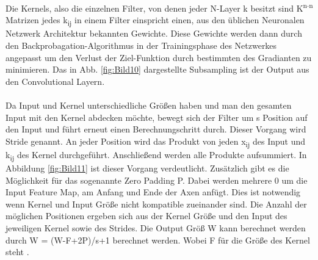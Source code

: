 \documentclass{llncs}
\begin{document}
Die Kernels, also die einzelnen Filter, von denen jeder N-Layer k besitzt sind K\textsuperscript{n$\cdot$n} Matrizen jedes k\textsubscript{ij} in einem Filter einspricht einen, aus den üblichen Neuronalen Netzwerk Architektur bekannten Gewichte. Diese Gewichte werden dann durch den Backprobagation-Algorithmus in der Trainingsphase des Netzwerkes angepasst um den Verlust der Ziel-Funktion durch bestimmten des Gradianten zu minimieren. Das in Abb. \ref{fig:Bild10} dargestellte Subsampling ist der Output aus den Convolutional Layern\cite{Grundlagen}. 
\\\\
Da Input und Kernel unterschiedliche Größen haben und man den gesamten Input mit den Kernel abdecken möchte, bewegt sich der Filter um s Position auf den Input und führt erneut einen Berechnungschritt durch. Dieser Vorgang wird Stride genannt. An jeder Position wird das Produkt von jeden x\textsubscript{ij} des Input und k\textsubscript{ij} des Kernel durchgeführt.  Anschließend werden alle Produkte aufsummiert. In Abbildung \ref{fig:Bild11} ist dieser Vorgang verdeutlicht. Zusätzlich gibt es die Möglichkeit für das sogenannte Zero Padding P. Dabei werden mehrere 0 um die Input Feature Map, am Anfang und Ende der Axen anfügt. Dies ist notwendig wenn Kernel und Input Größe nicht kompatible zueinander sind. Die Anzahl der möglichen Positionen ergeben sich aus der Kernel Größe und den Input des jeweiligen Kernel sowie des Strides. Die Output Größ W kann berechnet werden durch W = (W-F+2P)/s+1 berechnet werden. Wobei F für die Größe des Kernel steht \cite{conv}.
\end{document}
